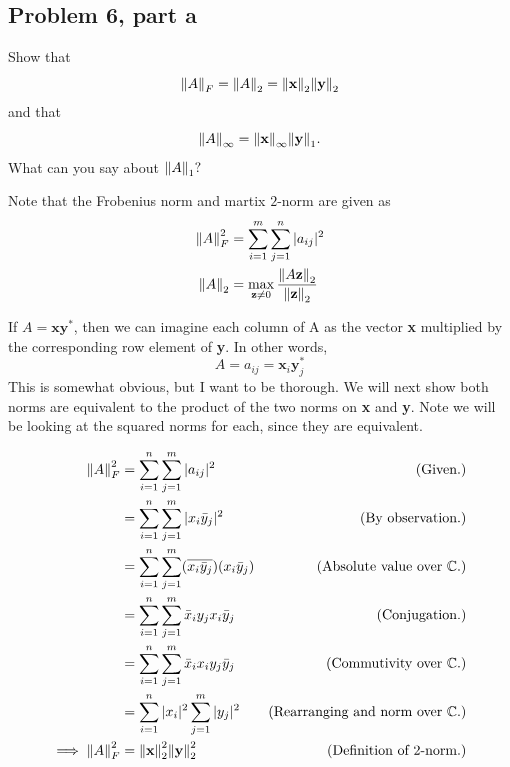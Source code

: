 \subsection{Problem 6, part a}
Show that
\[
\norm{A}_F = \norm{A}_2 = \norm{\textbf{x}}_2\norm{\textbf{y}}_2
\]
and that 
\[
\norm{A}_\infty = \norm{\textbf{x}}_\infty \norm{\textbf{y}}_1.
\]
What can you say about $\norm{A}_1?$
\partbreak
\begin{solution}

    Note that the Frobenius norm and martix $2$-norm are given as
    \alignbreak
    \begin{align}
    \norm{A}_F^2 &= \sum_{i = 1}^m\sum_{j = 1}^n|a_{ij}|^2\nonumber\\
    \norm{A}_2 &= \max_{\textbf{z} \neq 0}\frac{\norm{A\textbf{z}}_2}{\norm{\textbf{z}}_2}\nonumber
    \end{align}
    \alignbreak

    If $A = \textbf{x}\textbf{y}^*$, then we can imagine each column of A as the vector \textbf{x} multiplied by the corresponding row element of \textbf{y}. In other words,
    \[
    A = a_{ij} = \textbf{x}_i\textbf{y}_j^*
    \]
    This is somewhat obvious, but I want to be thorough. We will next show both norms are equivalent to the product of the two norms on \textbf{x} and \textbf{y}. Note we will be looking at the squared norms for each, since they are equivalent.
    
    \alignbreak
    \begin{align}
        \norm{A}_F^2 &= \sum_{i = 1}^{n}\sum_{j = 1}^m |a_{ij}|^2 &\text{(Given.)}\nonumber\\
        &= \sum_{i = 1}^{n}\sum_{j = 1}^m |x_i\Bar{y}_j|^2 &\text{(By observation.)}\nonumber\\
        &= \sum_{i = 1}^{n}\sum_{j = 1}^m (\overline{x_i\Bar{y}_j})(x_i\Bar{y}_j) &\text{(Absolute value over $\mathbb{C}$.)}\nonumber\\
        &= \sum_{i = 1}^{n}\sum_{j = 1}^m \Bar{x}_iy_jx_i\Bar{y}_j &\text{(Conjugation.)}\nonumber\\
        &= \sum_{i = 1}^{n}\sum_{j = 1}^m \Bar{x}_ix_i y_j\Bar{y}_j &\text{(Commutivity over $\mathbb{C}$.)}\nonumber\\
        &= \sum_{i = 1}^{n}|x_i|^2\sum_{j = 1}^m|y_j|^2 &\text{(Rearranging and norm over $\mathbb{C}$.)}\nonumber\\
     \implies   \norm{A}_F^2&= \norm{\textbf{x}}_2^2\norm{\textbf{y}}_2^2 &\text{(Definition of $2$-norm.)}\nonumber
    \end{align}
    \alignbreak


\end{solution}
